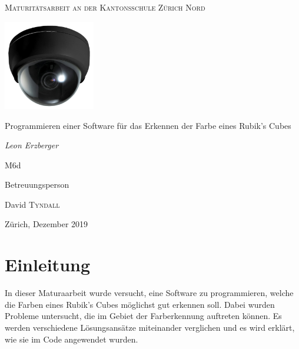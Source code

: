 \documentclass[a4paper, 12pt]{article}
\begin{document}
\begin{titlepage}
	\centering
	{\scshape\Large Maturitätsarbeit an der Kantonsschule Zürich Nord \par}
	\vspace{1cm}
	\includegraphics[width=0.3\textwidth]{Ueberwachungskamera}\par\vspace{1cm}
	\vspace{1cm}
	{\LARGE Programmieren einer Software für das Erkennen der Farbe eines Rubik's Cubes\par}
	\vspace{2cm}	
	{\Large\itshape Leon Erzberger\par}
	
	{\large M6d\par}
	\vfill
	Betreuungsperson\par
	David \textsc{Tyndall}

	\vfill

	{\large Zürich, Dezember 2019\par}
\end{titlepage}

\begin{abstract}%
\noindent
Ziel dieser Maturaarbeit war, ein möglichst gutes Programm für die Farberkennung eines Rubik's Cubes zu programmieren. Dafür wurden die beiden Farbräume RGB und HSV miteinander verglichen. Ausserdem wurde eine spezielle Methode für das Erkennen von schwarzen und weissen Feldern ausprobiert. Zum Schluss wurden dann noch zwei Methoden verglichen, die Korrekturen vornahmen, so dass jede Farbe exakt 9 mal vorkommt. Das ausschliessliche Verwenden von Hue zur Unterscheidung der Farben, das Benützen von der Methode, um weiss und schwarz loszuwerden, und das Verwenden einer der zwei Korrekturmethoden lieferte die besten Ergebnisse, mit durchschnittlich 8.5 Fehlern bei 54 Feldern.
\end{abstract}
\tableofcontents
\clearpage
{} 
\newpage
\section{Einleitung}
In dieser Maturaarbeit wurde versucht, eine Software zu programmieren, welche die Farben eines Rubik's Cubes möglichst gut erkennen soll. Dabei wurden Probleme untersucht, die im Gebiet der Farberkennung auftreten können. Es werden verschiedene Lösungsansätze miteinander verglichen und es wird erklärt, wie sie im Code angewendet wurden.
\end{document}
